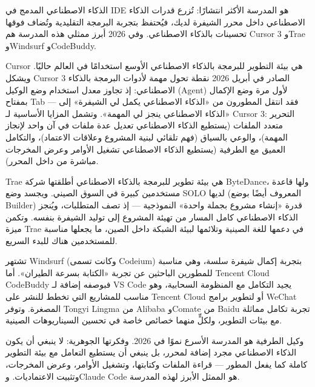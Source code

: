 
الذكاء الاصطناعي المدمج في IDE هو المدرسة الأكثر انتشارًا: تُزرع قدرات الذكاء الاصطناعي داخل محرر الشيفرة لديك، فيُحتفظ بتجربة البرمجة التقليدية وتُضاف فوقها تحسينات بالذكاء الاصطناعي. وفي 2026 أبرز ممثلي هذه المدرسة هم Cursor 3 وTrae وWindsurf وCodeBuddy.


Cursor هي بيئة التطوير للبرمجة بالذكاء الاصطناعي الأوسع استخدامًا في العالم حاليًا. ويشكل Cursor 3 الصادر في أبريل 2026 نقطة تحول مهمة لأدوات البرمجة بالذكاء الاصطناعي: إذ تجاوز معدل استخدام وضع الوكيل (Agent) لأول مرة وضع الإكمال بمفتاح Tab — فقد انتقل المطورون من «الذكاء الاصطناعي يكمل لي الشيفرة» إلى «الذكاء الاصطناعي ينجز لي المهمة». وتشمل المزايا الأساسية لـ Cursor 3: التحرير متعدد الملفات (يستطيع الذكاء الاصطناعي تعديل عدة ملفات في آن واحد لإنجاز المهمة)، والوعي بالسياق (فهم تلقائي لبنية المشروع وعلاقات الاعتماد)، والتكامل العميق مع الطرفية (يستطيع الذكاء الاصطناعي تشغيل الأوامر وعرض المخرجات مباشرة من داخل المحرر).


Trae هي بيئة تطوير للبرمجة بالذكاء الاصطناعي أطلقتها شركة ByteDance، ولها قاعدة مستخدمين كبيرة في السوق الصيني. ويجسد وضع SOLO لديها (المعروف أيضًا بوضع Builder) قدرة «إنشاء مشروع بجملة واحدة» النموذجية — إذ تصف المتطلبات، ويُنجز الذكاء الاصطناعي كامل المسار من تهيئة المشروع إلى توليد الشيفرة بنفسه. وتكمن ميزة Trae في دعمها للغة الصينية وتلائمها لبيئة الشبكة داخل الصين، ما يجعلها مناسبة للمستخدمين هناك للبدء السريع.


تشتهر Windsurf (وكانت تسمى Codeium) بتجربة إكمال شيفرة سلسة، وهي مناسبة للمطورين الباحثين عن تجربة «الكتابة بسرعة الطيران». أما Tencent Cloud CodeBuddy فبوصفه إضافة لـ VS Code يجيد التكامل مع المنظومة السحابية، وهو مناسب للمشاريع التي تخطط للنشر على Tencent Cloud أو لتطوير برامج WeChat المصغرة. وتوفر Tongyi Lingma من Alibaba وComate من Baidu تجربة تكامل مماثلة مع بيئات التطوير، ولكلٍّ منهما خصائص خاصة في تحسين السيناريوهات الصينية.


وكيل الطرفية هو المدرسة الأسرع نموًا في 2026. وفكرتها الجوهرية: لا ينبغي أن يكون الذكاء الاصطناعي مجرد إضافة لمحرر، بل ينبغي أن يستطيع التعامل مع بيئة التطوير كاملة كما يفعل المطور — قراءة الملفات وكتابتها، وتشغيل الأوامر، وعرض المخرجات، وتثبيت الاعتماديات. وClaude Code هو الممثل الأبرز لهذه المدرسة.

